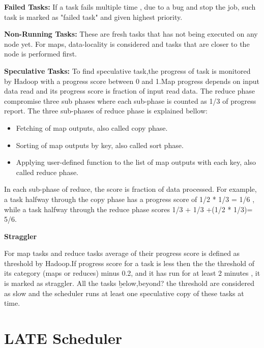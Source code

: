\textbf{Failed Tasks:}  If a task fails multiple time , due to a bug and stop the job, such task is marked as "failed task" and given highest priority. 

\textbf{Non-Running Tasks:} These are fresh tasks that has not being executed on any node yet. For maps, data-locality is considered and tasks that are closer to the node is performed first. 

\textbf{Speculative Tasks:} To find speculative task,the progress of task is monitored by Hadoop with a progress score between 0 and 1.Map progress depends on input data read and its progress score is fraction of input read data. The reduce phase compromise three sub phases where each sub-phase is counted as 1/3 of progress report. The three sub-phases of reduce phase is explained bellow: \\

\begin{itemize}
\item{Fetching of map outputs, also called copy phase.}
\item{Sorting of map outputs by key, also called sort phase.}
\item{Applying user-defined function to the list of map outputs with each key, also called reduce phase. }
\end{itemize}
	

In each sub-phase of reduce, the score is fraction of data processed. For example, a task halfway through the copy phase has a progress score of 1/2 * 1/3 = 1/6 , while a task halfway through the reduce phase scores 1/3 + 1/3 +(1/2 * 1/3)= 5/6.

\textbf{Straggler} 

For map tasks and reduce tasks average of their progress score is defined as threshold by Hadoop.If progress score for a task is less then the the threshold of its category (maps or reduces) minus 0.2, and it has run for at least 2 minutes , it is marked as straggler. All the tasks \b{below,beyond?} the threshold are considered as slow and the scheduler runs at least one speculative copy of these tasks at time\cite{mat1}. 
 





\section{LATE Scheduler}

